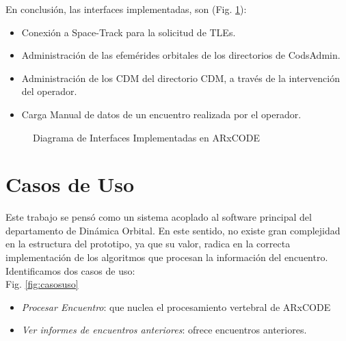 En conclusi\'on, las interfaces implementadas, son (Fig. \ref{fig:interfacesImpl}):\\
 
\begin{itemize}
\itemsep0em
 \item Conexi\'on a Space-Track para la solicitud de TLEs.
 \item Administraci\'on de las efem\'erides orbitales de los directorios de CodsAdmin.
 \item Administraci\'on de los CDM del directorio CDM, a trav\'es de la intervenci\'on del operador.
 \item Carga Manual de datos de un encuentro realizada por el operador.
\end{itemize}

\begin{figure}
\centering
  \caption[Diagrama de Interfaces Implementadas en ARxCODE]{Diagrama de Interfaces Implementadas en ARxCODE}
  \label{fig:interfacesImpl}
\end{figure}

\section{Casos de Uso}

Este trabajo se pens\'o como un sistema acoplado al software principal del departamento de Din\'amica Orbital. En este sentido, no existe gran complejidad en la estructura del prototipo, ya que su valor, radica en la correcta implementaci\'on de los algoritmos que procesan la informaci\'on del encuentro. Identificamos dos casos de uso:\\
Fig. \ref{fig:casosuso}
 
 
\begin{itemize}
 \item {\it{Procesar Encuentro}}: que nuclea el procesamiento vertebral de ARxCODE
 \item {\it{Ver informes de encuentros anteriores}}: ofrece encuentros anteriores.
\end{itemize}

